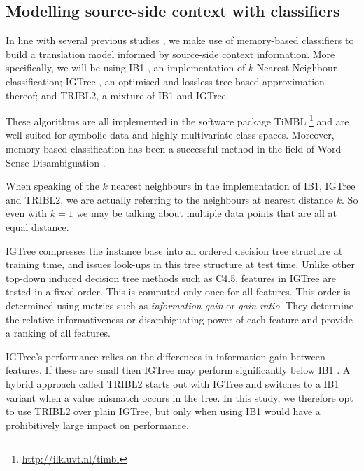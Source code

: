 \documentclass[smallextended]{svjour3}       %
\theoremstyle{break}
\begin{document}
\subsection{Modelling source-side context with classifiers}

In line with several previous studies \citep{Rejwanul+11,PBMBMT,
  Stroppa+07,MARKERBASED}, we make use of memory-based classifiers to
build a translation model informed by source-side context
information. More specifically, we will be using IB1 \citep{IB1}, an
implementation of $k$-Nearest Neighbour classification; IGTree
\citep{IGTree}, an optimised and lossless tree-based approximation
thereof; and TRIBL2, a mixture of IB1 and IGTree.

These algorithms are all implemented in the software package TiMBL
\citep{TIMBL}\footnote{\url{http://ilk.uvt.nl/timbl}} and are
well-suited for symbolic data and highly multivariate class spaces.
Moreover, memory-based classification has been a successful method in
the field of Word Sense Disambiguation \citep{SENSEVAL2,WSD2}.

When speaking of the $k$ nearest neighbours in the implementation of IB1,
IGTree and TRIBL2, we are actually referring to the neighbours at nearest
distance $k$. So even with $k=1$ we may be talking about multiple data points
that are all at equal distance.

IGTree compresses the instance base into an ordered decision tree structure at
training time, and issues look-ups in this tree structure at test time. Unlike
other top-down induced decision tree methods such as C4.5, features in IGTree
are tested in a fixed order. This is computed only once 
for all features. This order is determined using metrics such as
\emph{information gain} or \emph{gain ratio}. They determine the relative
informativeness or disambiguating power of each feature and provide a ranking of
all features. 

IGTree's performance relies on the differences in information gain between
features. If these are small then IGTree may perform significantly below IB1
\citep{TIMBL}. A hybrid approach called TRIBL2 \citep{TIMBL} starts out with
IGTree and switches to a IB1 variant when a value mismatch occurs in the tree.
In this study, we therefore opt to use TRIBL2 over plain IGTree, but only when
using IB1 would have a prohibitively large impact on performance.
\end{document}

